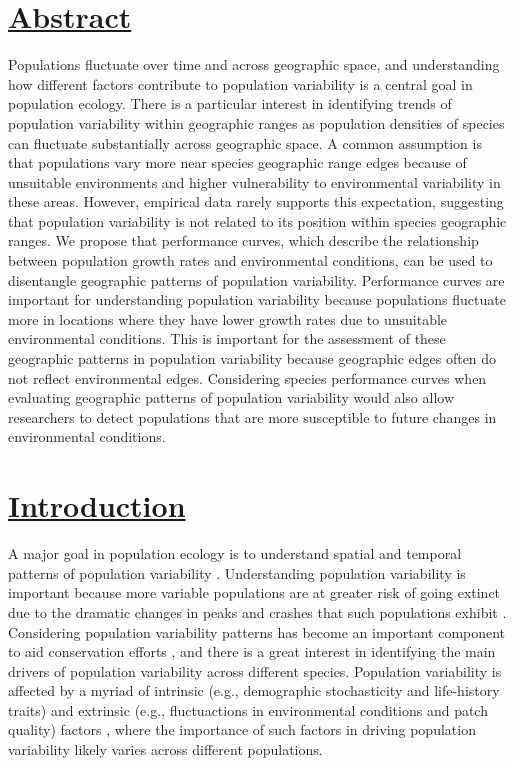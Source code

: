 \section*{\textbf{\underline{Abstract}}}
Populations fluctuate over time and across geographic space, and understanding how different factors contribute to population variability is a central goal in population ecology. There is a particular interest in identifying trends of population variability within geographic ranges as population densities of species can fluctuate substantially across geographic space. A common assumption is that populations vary more near species geographic range edges because of unsuitable environments and higher vulnerability to environmental variability in these areas. However, empirical data rarely supports this expectation, suggesting that population variability is not related to its position within species geographic ranges. We propose that performance curves, which describe the relationship between population growth rates and environmental conditions, can be used to disentangle geographic patterns of population variability. Performance curves are important for understanding population variability because populations fluctuate more in locations where they have lower growth rates due to unsuitable environmental conditions. This is important for the assessment of these geographic patterns in population variability because geographic edges often do not reflect environmental edges. Considering species performance curves when evaluating geographic patterns of population variability would also allow researchers to detect populations that are more susceptible to future changes in environmental conditions.\\

\section*{\textbf{\underline{Introduction}}}

A major goal in population ecology is to understand spatial and temporal patterns of population variability \parencite{arino1995,lundberg2000,williams2003}. Understanding population variability is important because more variable populations are at greater risk of going extinct due to the dramatic changes in peaks and crashes that such populations exhibit \parencite{lande1988, vucetich2000}. Considering population variability patterns has become an important component to aid conservation efforts \parencite{vucetich2000, burgess2020}, and there is a great interest in identifying the main drivers of population variability across different species. Population variability is affected by a myriad of intrinsic (e.g., demographic stochasticity and life-history traits) and extrinsic (e.g., fluctuactions in environmental conditions and patch quality) factors \parencite{lande1993, arino1995, melbourne2008}, where the importance of such factors in driving population variability likely varies across different populations.


